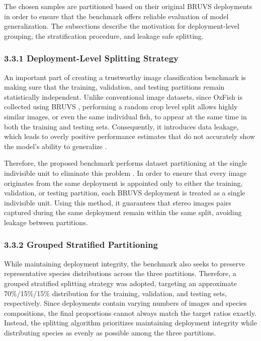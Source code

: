 \documentclass[preprint,12pt]{elsarticle}
\begin{document}
The chosen samples are partitioned based on their original BRUVS
deployments in order to ensure that the benchmark offers reliable
evaluation of model generalization. The subsections describe the
motivation for deployment-level grouping, the stratification procedure,
and leakage safe splitting.

\subsubsection*{3.3.1 Deployment-Level Splitting
Strategy}\label{deployment-level-splitting-strategy}

An important part of creating a trustworthy image classification
benchmark is making sure that the training, validation, and testing
partitions remain statistically independent. Unlike conventional image
datasets, since OzFish is collected using BRUVS
\cite{ref4}
\cite{ref22}, performing a random crop level
split allows highly similar images, or even the same individual fish, to
appear at the same time in both the training and testing sets.
Consequently, it introduces data leakage, which leads to overly positive
performance estimates that do not accurately show the model's ability to
generalize \cite{ref17}
\cite{ref18}
\cite{ref20}.

Therefore, the proposed benchmark performs dataset partitioning at the
single indivisible unit to eliminate this problem
\cite{ref17}. In order to ensure that every
image originates from the same deployment is appointed only to either
the training, validation, or testing partition, each BRUVS deployment is
treated as a single indivisible unit. Using this method, it guarantees
that stereo images pairs captured during the same deployment
\cite{ref4} \cite{ref19}
remain within the same split, avoiding leakage between partitions.

\subsubsection*{3.3.2 Grouped Stratified
Partitioning}\label{grouped-stratified-partitioning}

While maintaining deployment integrity, the benchmark also seeks to
preserve representative species distributions across the three
partitions. Therefore, a grouped stratified splitting strategy was
adopted, targeting an approximate 70\%/15\%/15\% distribution for the
training, validation, and testing sets, respectively. Since deployments
contain varying numbers of images and species compositions, the final
proportions cannot always match the target ratios exactly. Instead, the
splitting algorithm prioritizes maintaining deployment integrity while
distributing species as evenly as possible among the three partitions.
\end{document}
